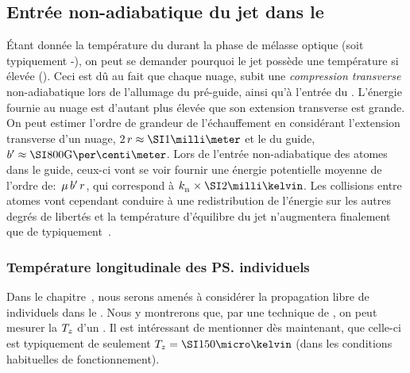 \subsection{Entrée non-adiabatique du jet dans le \gm}\label{sec:EntreeGuideNonAdiabatique}

Étant donnée la température du \nat durant la phase de mélasse optique (soit typiquement -), on peut se demander pourquoi le jet possède une température si élevée (). Ceci est dû au fait que chaque nuage, subit une \emph{compression transverse} non-adiabatique lors de l'allumage du pré-guide, ainsi qu'à l'entrée du \gm. L'énergie fournie au nuage est d'autant plus élevée que son extension transverse est grande\footnotemark. 
\ApplicationNumerique
{
On peut estimer l'ordre de grandeur de l'échauffement en considérant l'extension transverse d'un nuage, $2\,r\approx\mm{1}$ et le \gtchm du guide, $\gradB \approx \gausspcm{800}$. Lors de l'entrée non-adiabatique des atomes dans le guide, ceux-ci vont se voir fournir une énergie potentielle moyenne de l'ordre de:~$\mu\,{b'}\,r$, qui correspond à $\kb\times\milliK{2}$.
Les collisions entre atomes vont cependant conduire à une redistribution de l'énergie sur les autres degrés de libertés et la température d'équilibre du jet n'augmentera finalement que de typiquement\footnotemark~.
}

{\AjouteLigne}
\RemonteUnPeuFig\RemonteUnPeuFig\RemonteUnPeuFig
\subsubsection{Température longitudinale des \ps individuels}
Dans le chapitre~, nous serons amenés à considérer la propagation libre de \pats individuels dans le \gm. Nous y montrerons que, par une technique de , on peut mesurer la \dispvitlong $T_{z}$ d'un \p. Il est intéressant de mentionner dès maintenant, que celle-ci est typiquement de seulement $\Tlong=\microK{150}$ (dans les conditions habituelles de fonctionnement).

